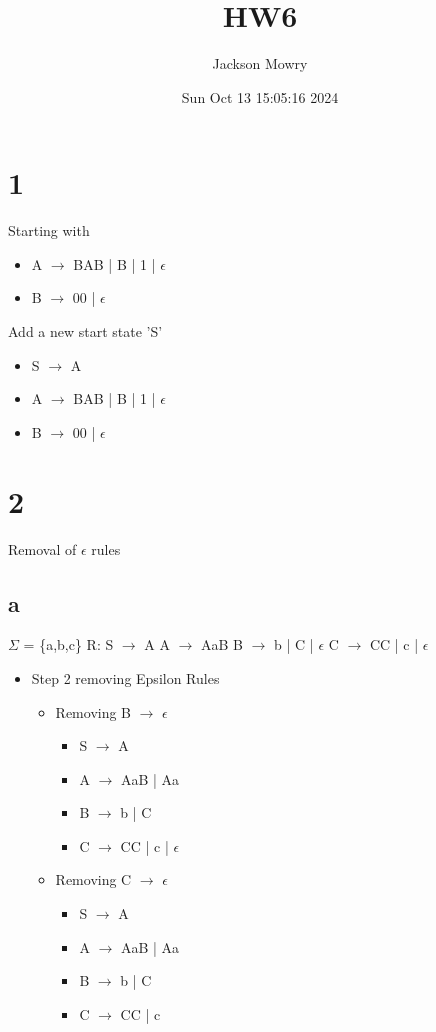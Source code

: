 \documentclass[11pt]{article}
\author{Jackson Mowry}
\date{Sun Oct 13 15:05:16 2024}
\title{HW6}
\begin{document}
\maketitle
\section{1}
\label{sec:org69a8b1e}
Starting with
\begin{itemize}
\item A \(\rightarrow\) BAB | B | 1 | \(\epsilon\)
\item B \(\rightarrow\) 00 | \(\epsilon\)
\end{itemize}

Add a new start state 'S'
\begin{itemize}
\item S \(\rightarrow\) A
\item A \(\rightarrow\) BAB | B | 1 | \(\epsilon\)
\item B \(\rightarrow\) 00 | \(\epsilon\)
\end{itemize}
\section{2}
\label{sec:org613adb0}
Removal of \(\epsilon\) rules
\subsection{a}
\label{sec:org5143ceb}
\(\Sigma\) = \{a,b,c\}
R:      S \(\rightarrow\) A
        A \(\rightarrow\) AaB
        B \(\rightarrow\) b | C | \(\epsilon\)
        C \(\rightarrow\) CC | c | \(\epsilon\)

\begin{itemize}
\item Step 2 removing Epsilon Rules
\begin{itemize}
\item Removing B \(\rightarrow\) \(\epsilon\)
\begin{itemize}
\item S \(\rightarrow\) A
\item A \(\rightarrow\) AaB | Aa
\item B \(\rightarrow\) b | C
\item C \(\rightarrow\) CC | c | \(\epsilon\)
\end{itemize}
\item Removing C \(\rightarrow\) \(\epsilon\)
\begin{itemize}
\item S \(\rightarrow\) A
\item A \(\rightarrow\) AaB | Aa
\item B \(\rightarrow\) b | C
\item C \(\rightarrow\) CC | c
\end{itemize}
\end{itemize}
\end{itemize}
\end{document}
